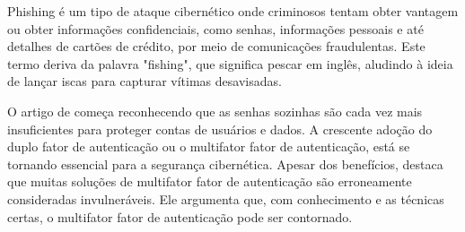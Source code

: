 \documentclass[12pt]{article}
\begin{document}
Phishing é um tipo de ataque cibernético onde criminosos tentam obter
vantagem ou obter informações confidenciais, como senhas, informações
pessoais e até detalhes de cartões de crédito, por meio de comunicações
fraudulentas.
Este termo deriva da palavra "fishing", que significa pescar em inglês,
aludindo à ideia de lançar iscas para capturar vítimas desavisadas.

O artigo de \cite{article:3} começa reconhecendo que as senhas sozinhas são cada vez mais
insuficientes para proteger contas de usuários e dados.
A crescente adoção do duplo fator de autenticação ou o multifator fator de autenticação, está
se tornando essencial para a segurança cibernética.
Apesar dos benefícios, \cite{article:3} destaca que muitas soluções de multifator fator de
autenticação são erroneamente consideradas invulneráveis.
Ele argumenta que, com conhecimento e as técnicas certas, o multifator fator de autenticação
pode ser contornado.
\end{document}
